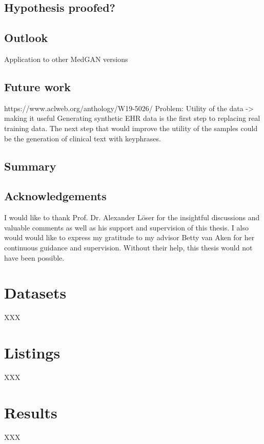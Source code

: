 \documentclass[11pt, a4paper]{book}
\begin{document}
\section{Hypothesis proofed?}
\section{Outlook}
Application to other MedGAN versions
\section{Future work}
https://www.aclweb.org/anthology/W19-5026/
Problem: Utility of the data -> making it useful
Generating synthetic EHR data is the first step to replacing real training data. The next step  that would improve the utility of the samples could be the generation of clinical text with keyphrases.

\section{Summary}

\newpage

\section*{Acknowledgements}
I would like to thank Prof. Dr. Alexander Löser for the insightful discussions and valuable comments as well as his support and supervision of this thesis. I also would would like to express my gratitude to my advisor Betty van Aken for her continuous guidance and supervision. Without their help, this thesis would not have been possible.


\appendix
\renewcommand\chaptername{Appendix}

\chapter{Datasets}
XXX

\chapter{Listings}
XXX

\chapter{Results} 
XXX
\end{document}
